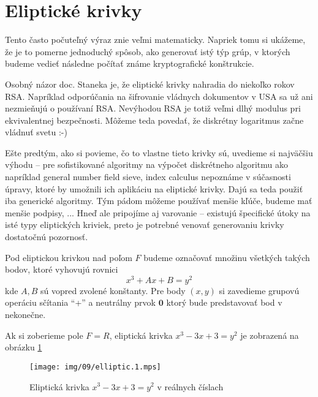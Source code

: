 \section{Eliptické krivky}

Tento často počuteľný výraz znie veľmi matematicky. Napriek tomu si
ukážeme, že je to pomerne jednoduchý spôsob, ako generovať istý týp
grúp, v ktorých budeme vedieť následne počítať známe kryptografické
konštrukcie.

\begin{poznamka}
    Osobný názor doc. Staneka je, že eliptické krivky nahradia do
    niekoľko rokov RSA. Napríklad odporúčania na šifrovanie vládnych
    dokumentov v USA sa už ani nezmieňujú o používaní RSA. Nevýhodou
    RSA je totiž veľmi dlhý modulus pri ekvivalentnej bezpečnosti.
    Môžeme teda povedať, že diskrétny logaritmus začne vládnuť svetu
    :-)
\end{poznamka}

Ešte predtým, ako si povieme, čo to vlastne tieto krivky sú, uvedieme
si najväčšiu výhodu -- pre sofistikované algoritmy na
výpočet diskrétneho algoritmu ako napríklad general number field
sieve, index calculus nepoznáme v súčasnosti úpravy, ktoré by umožnili
ich aplikáciu na eliptické krivky. Dajú sa teda použiť iba generické
algoritmy. Tým pádom môžeme používať menšie kľúče, budeme mať menšie
podpisy, ... Hneď ale pripojíme aj varovanie -- existujú špecifické
útoky na isté typy eliptických kriviek, preto je potrebné venovať
generovaniu krivky dostatočnú pozornosť.

\begin{definicia}
    Pod eliptickou krivkou nad poľom $F$ budeme označovať množinu
    všetkých takých bodov, ktoré vyhovujú rovnici
    \begin{equation*}
        x^3 + A x + B = y^2
    \end{equation*}
    kde $A,B$ sú vopred zvolené konštanty.
    Pre body $(x,y)$ si zavedieme grupovú operáciu sčítania ``+''
    a neutrálny prvok $\mathbf{0}$
    ktorý bude predstavovať bod v nekonečne.
\end{definicia}

Ak si zoberieme pole $F=R$, eliptická krivka $x^3 -3x+3=y^2$ je
zobrazená na obrázku \ref{fig:elliptic1}

\begin{figure}[h]
    \centering
    \texttt{[image: img/09/elliptic.1.mps]}
    \caption{Eliptická krivka $x^3 - 3x +3 = y^2$ v reálnych číslach}
    \label{fig:elliptic1}
\end{figure}

